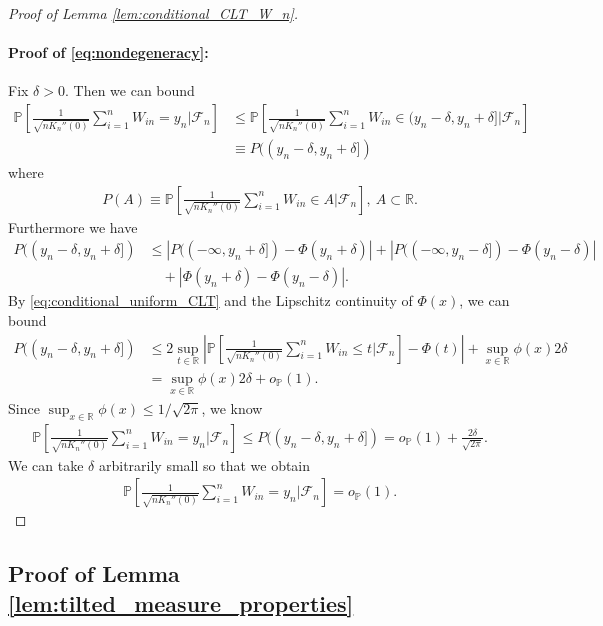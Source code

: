 \documentclass[12pt]{article}
\theoremstyle{definition}
\def\P{\mathbb{P}}
\def\P{\mathbb{P}}
\renewcommand{\P}{\mathbb{P}}							%
\begin{document}
\begin{proof}[Proof of Lemma \ref{lem:conditional_CLT_W_n}]
	\paragraph{Proof of \eqref{eq:nondegeneracy}:}
		Fix $\delta>0$. Then we can bound 
		\begin{align*}
			\P\left[\frac{1}{\sqrt{nK_n''(0)}}\sum_{i=1}^n W_{in}=y_n|\mathcal{F}_n\right]
			&
			\leq \P\left[\frac{1}{\sqrt{nK_n''(0)}}\sum_{i=1}^n W_{in}\in (y_n-\delta,y_n+\delta]|\mathcal{F}_n\right]\\
			&
			\equiv P((y_n-\delta,y_n+\delta])
		\end{align*}
		where 
		\begin{align*}
			P(A)\equiv \P\left[\frac{1}{\sqrt{nK_n''(0)}}\sum_{i=1}^n W_{in}\in A|\mathcal{F}_n\right],\ A\subset \mathbb{R}.
		\end{align*}
		Furthermore we have 
		\begin{align*}
			P((y_n-\delta,y_n+\delta])
			&
			\leq 
			\left|P((-\infty, y_n+\delta])-\Phi(y_n+\delta)\right|+\left|P((-\infty, y_n-\delta])-\Phi(y_n-\delta)\right|\\
			&
			\quad  + |\Phi(y_n+\delta)-\Phi(y_n-\delta)|.
		\end{align*}
		By \eqref{eq:conditional_uniform_CLT} and the Lipschitz continuity of $\Phi(x)$, we can bound 
		\begin{align*}
			P((y_n-\delta,y_n+\delta])
			&
			\leq 2\sup_{t\in\mathbb{R}}\left|\P\left[\frac{1}{\sqrt{nK_n''(0)}}\sum_{i=1}^n W_{in}\leq t|\mathcal{F}_n\right]-\Phi(t)\right|+\sup_{x\in\mathbb{R}}\phi(x)2\delta\\
			&
			=\sup_{x\in\mathbb{R}}\phi(x)2\delta+o_\P(1).
		\end{align*}
		Since $\sup_{x\in\mathbb{R}}\phi(x)\leq 1/\sqrt{2\pi}$, we know 
		\begin{align*}
			\P\left[\frac{1}{\sqrt{nK_n''(0)}}\sum_{i=1}^n W_{in}=y_n|\mathcal{F}_n\right]\leq P((y_n-\delta,y_n+\delta])=o_\P(1)+\frac{2\delta}{\sqrt{2\pi}}.
		\end{align*}
		We can take $\delta$ arbitrarily small so that we obtain
		\begin{align*}
			\P\left[\frac{1}{\sqrt{nK_n''(0)}}\sum_{i=1}^n W_{in}=y_n|\mathcal{F}_n\right]=o_\P(1).
		\end{align*}
\end{proof}

\subsection{Proof of Lemma \ref{lem:tilted_measure_properties}}
  
\end{document}

